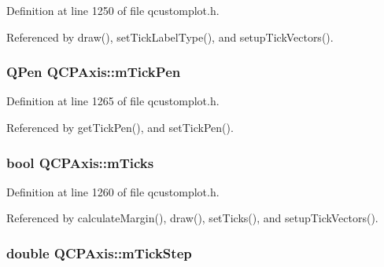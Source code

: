 Definition at line 1250 of file qcustomplot.\+h.



Referenced by draw(), set\+Tick\+Label\+Type(), and setup\+Tick\+Vectors().

\hypertarget{class_q_c_p_axis_a1d52c78c856d8bd1f331d4ec4e63d944}{}
\subsubsection[{m\+Tick\+Pen}]{\setlength{\rightskip}{0pt plus 5cm}Q\+Pen Q\+C\+P\+Axis\+::m\+Tick\+Pen\hspace{0.3cm}{\ttfamily [protected]}}\label{class_q_c_p_axis_a1d52c78c856d8bd1f331d4ec4e63d944}


Definition at line 1265 of file qcustomplot.\+h.



Referenced by get\+Tick\+Pen(), and set\+Tick\+Pen().

\hypertarget{class_q_c_p_axis_ab111e74bba22e06848897c932fc549fe}{}
\subsubsection[{m\+Ticks}]{\setlength{\rightskip}{0pt plus 5cm}bool Q\+C\+P\+Axis\+::m\+Ticks\hspace{0.3cm}{\ttfamily [protected]}}\label{class_q_c_p_axis_ab111e74bba22e06848897c932fc549fe}


Definition at line 1260 of file qcustomplot.\+h.



Referenced by calculate\+Margin(), draw(), set\+Ticks(), and setup\+Tick\+Vectors().

\hypertarget{class_q_c_p_axis_a4fe96830fc5a2711e20fe5edccfe2ed3}{}
\subsubsection[{m\+Tick\+Step}]{\setlength{\rightskip}{0pt plus 5cm}double Q\+C\+P\+Axis\+::m\+Tick\+Step\hspace{0.3cm}{\ttfamily [protected]}}\label{class_q_c_p_axis_a4fe96830fc5a2711e20fe5edccfe2ed3}



